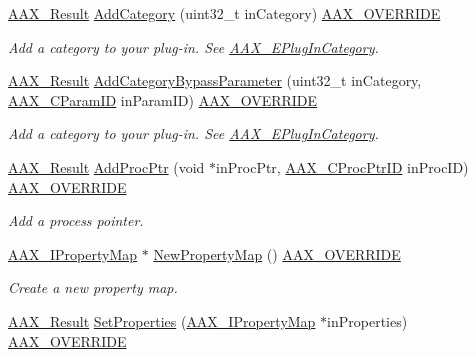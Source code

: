 \begin{DoxyCompactItemize}
\mbox{\hyperlink{a00392_a4d8f69a697df7f70c3a8e9b8ee130d2f}{A\+A\+X\+\_\+\+Result}} \mbox{\hyperlink{a01913_af0f874b5d7dd2a89b3c35eb6b73d9f53}{Add\+Category}} (uint32\+\_\+t in\+Category) \mbox{\hyperlink{a00392_ac2f24a5172689ae684344abdcce55463}{A\+A\+X\+\_\+\+O\+V\+E\+R\+R\+I\+DE}}
\begin{DoxyCompactList}\small\item\em Add a category to your plug-\/in. See \mbox{\hyperlink{a00491_aef9637518fb1ac0e2f403444c73aba4a}{A\+A\+X\+\_\+\+E\+Plug\+In\+Category}}. \end{DoxyCompactList}\item 
\mbox{\hyperlink{a00392_a4d8f69a697df7f70c3a8e9b8ee130d2f}{A\+A\+X\+\_\+\+Result}} \mbox{\hyperlink{a01913_aad0c7c9de79b6c812befd0860cc16cc5}{Add\+Category\+Bypass\+Parameter}} (uint32\+\_\+t in\+Category, \mbox{\hyperlink{a00392_a1440c756fe5cb158b78193b2fc1780d1}{A\+A\+X\+\_\+\+C\+Param\+ID}} in\+Param\+ID) \mbox{\hyperlink{a00392_ac2f24a5172689ae684344abdcce55463}{A\+A\+X\+\_\+\+O\+V\+E\+R\+R\+I\+DE}}
\begin{DoxyCompactList}\small\item\em Add a category to your plug-\/in. See \mbox{\hyperlink{a00491_aef9637518fb1ac0e2f403444c73aba4a}{A\+A\+X\+\_\+\+E\+Plug\+In\+Category}}. \end{DoxyCompactList}\item 
\mbox{\hyperlink{a00392_a4d8f69a697df7f70c3a8e9b8ee130d2f}{A\+A\+X\+\_\+\+Result}} \mbox{\hyperlink{a01913_a4b0d74ac4f4fb4ef506a5b639d0510de}{Add\+Proc\+Ptr}} (void $\ast$in\+Proc\+Ptr, \mbox{\hyperlink{a00401_af0682195d377392ad356fd2b00c36892}{A\+A\+X\+\_\+\+C\+Proc\+Ptr\+ID}} in\+Proc\+ID) \mbox{\hyperlink{a00392_ac2f24a5172689ae684344abdcce55463}{A\+A\+X\+\_\+\+O\+V\+E\+R\+R\+I\+DE}}
\begin{DoxyCompactList}\small\item\em Add a process pointer. \end{DoxyCompactList}\item 
\mbox{\hyperlink{a01869}{A\+A\+X\+\_\+\+I\+Property\+Map}} $\ast$ \mbox{\hyperlink{a01913_a3e7b723b8e60fbc6271c6f5bcc7ad7dd}{New\+Property\+Map}} () \mbox{\hyperlink{a00392_ac2f24a5172689ae684344abdcce55463}{A\+A\+X\+\_\+\+O\+V\+E\+R\+R\+I\+DE}}
\begin{DoxyCompactList}\small\item\em Create a new property map. \end{DoxyCompactList}\item 
\mbox{\hyperlink{a00392_a4d8f69a697df7f70c3a8e9b8ee130d2f}{A\+A\+X\+\_\+\+Result}} \mbox{\hyperlink{a01913_a80928483b2aaa3f7e2a607499ee5180c}{Set\+Properties}} (\mbox{\hyperlink{a01869}{A\+A\+X\+\_\+\+I\+Property\+Map}} $\ast$in\+Properties) \mbox{\hyperlink{a00392_ac2f24a5172689ae684344abdcce55463}{A\+A\+X\+\_\+\+O\+V\+E\+R\+R\+I\+DE}}

\end{DoxyCompactItemize}
